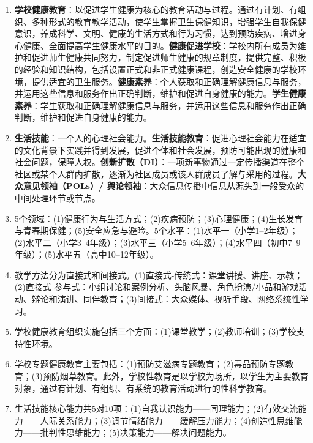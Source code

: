 \begin{enumerate}[leftmargin=*, itemsep=5pt]
    \item \textbf{学校健康教育}：以促进学生健康为核心的教育活动与过程。通过有计划、有组织、多种形式的教育教学活动，使学生掌握卫生保健知识，增强学生自我保健意识，养成科学、文明、健康的生活方式和行为习惯，达到预防疾病、增进身心健康、全面提高学生健康水平的目的。\textbf{健康促进学校}：学校内所有成员为维护和促进师生健康共同努力，制定促进师生健康的规章制度，提供完整、积极的经验和知识结构，包括设置正式和非正式健康课程，创造安全健康的学校环境，提供适宜的卫生服务。\textbf{健康素养}：个人获取和正确理解健康信息与服务，并运用这些信息和服务作出正确判断，维护和促进自身健康的能力。\textbf{学生健康素养}：学生获取和正确理解健康信息与服务，并运用这些信息和服务作出正确判断，维护和促进自身健康的能力。

    \item \textbf{生活技能}：一个人的心理社会能力。\textbf{生活技能教育}：促进心理社会能力在适宜的文化背景下实践并得到发展，促进个体和社会发展，预防可能出现的健康和社会问题，保障人权。\textbf{创新扩散（DI）}：一项新事物通过一定传播渠道在整个社区或某个人群内扩散，逐渐为社区成员或该人群成员了解与采用的过程。\textbf{大众意见领袖（POLs）/ 舆论领袖}：大众信息传播中信息从源头到一般受众的中间处理环节或节点。

    \item 5个领域：(1)健康行为与生活方式；(2)疾病预防；(3)心理健康；(4)生长发育与青春期保健；(5)安全应急与避险。5个水平：(1)水平一（小学1--2年级）；(2)水平二（小学3--4年级）；(3)水平三（小学5--6年级）；(4)水平四（初中7--9年级）；(5)水平五（高中10--12年级）。

    \item 教学方法分为直接式和间接式。(1)直接式-传统式：课堂讲授、讲座、示教；(2)直接式-参与式：小组讨论和案例分析、头脑风暴、角色扮演/小品和游戏活动、辩论和演讲、同伴教育；(3)间接式：大众媒体、视听手段、网络系统性学习。

    \item 学校健康教育组织实施包括三个方面：(1)课堂教学；(2)教师培训；(3)学校支持性环境。

    \item 学校专题健康教育主要包括：(1)预防艾滋病专题教育；(2)毒品预防专题教育；(3)预防烟草教育。此外，学校性教育是以学校为场所，以学生为主要教育对象，通过有计划、有组织、有系统的教育活动进行的性科学教育。

    \item 生活技能核心能力共5对10项：(1)自我认识能力——同理能力；(2)有效交流能力——人际关系能力；(3)调节情绪能力——缓解压力能力；(4)创造性思维能力——批判性思维能力；(5)决策能力——解决问题能力。


\end{enumerate}
